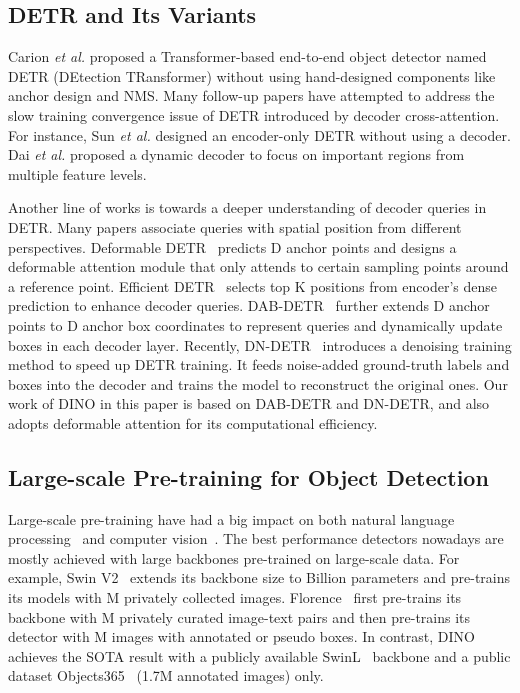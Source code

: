 \documentclass[runningheads]{llncs}
\begin{document}
\subsection{DETR and Its Variants}
Carion \textit{et al.} \cite{carion2020end} proposed a Transformer-based end-to-end object detector named DETR (DEtection TRansformer) without using hand-designed components like anchor design and NMS. Many follow-up papers have attempted to address the slow training convergence issue of DETR introduced by decoder cross-attention. For instance, Sun \textit{et al.} \cite{sun2020rethinking} designed an encoder-only DETR without using a decoder. Dai \textit{et al.} \cite{dai2021dynamic} proposed a dynamic decoder to focus on important regions from multiple feature levels.

Another line of works is towards a deeper understanding of decoder queries in DETR. Many papers associate queries with spatial position from different perspectives. Deformable DETR~\cite{zhu2020deformable} predicts D anchor points and designs a deformable attention module that only attends to certain sampling points around a reference point. Efficient DETR~\cite{yao2021efficient} selects top K positions from encoder's dense prediction to enhance decoder queries. DAB-DETR~\cite{liu2022dab} further extends D anchor points to D anchor box coordinates to represent queries and dynamically update boxes in each decoder layer. Recently, DN-DETR~\cite{li2022dn} introduces a denoising training method to speed up DETR training. It feeds noise-added ground-truth labels and boxes into the decoder and trains the model to reconstruct the original ones. Our work of DINO in this paper is based on DAB-DETR and DN-DETR, and also adopts deformable attention for its computational efficiency.

\subsection{Large-scale Pre-training for Object Detection}
Large-scale pre-training have had a big impact on both natural language processing~\cite{devlin2018bert} and computer vision~\cite{AlecRadford2021LearningTV}. The best performance detectors nowadays are mostly achieved with large backbones pre-trained on large-scale data. For example, Swin V2~\cite{liu2021swinv2} extends its backbone size to  Billion parameters
and pre-trains its models with M privately collected images.
Florence~\cite{yuan2021florence} first pre-trains its backbone with M privately curated image-text pairs and then pre-trains its detector with M images with annotated or pseudo boxes. In contrast, DINO achieves the SOTA result with a publicly available SwinL~\cite{liu2021swin} backbone and a public dataset Objects365~\cite{shao2019objects365} (1.7M annotated images) only.
\end{document}
